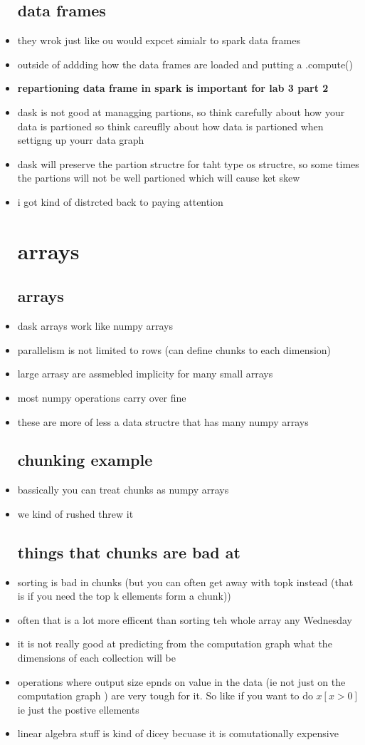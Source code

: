 \documentclass{article}
\begin{document}
\begin{itemize}
\subsection{data frames}
\item they wrok just like ou would expcet simialr to spark data frames 
\item outside of addding how the data frames are loaded and putting a .compute()
\item \textbf{repartioning data frame in spark is important for lab 3 part 2}
\item dask is not good at managging partions, so think carefully about how your data is partioned so think careuflly about how data is partioned when settigng up yourr data graph
\item dask will preserve the partion structre for taht type os structre, so some times the partions will not be well partioned which will cause ket skew
\item i got kind of distrcted back to paying attention 

\section{arrays}
\subsection{arrays}
\item dask arrays work like numpy arrays 
\item parallelism is not limited to rows  (can define chunks to each dimension)
\item large arrasy are assmebled implicity for many small arrays 
\item most numpy operations carry over fine 
\item these are more of less a data structre that has many numpy arrays 
\subsection{chunking example}
\item bassically you can treat chunks as numpy arrays 
\item we kind of rushed threw it 
\subsection{things that chunks are bad at}
\item sorting is bad in chunks (but you can often get away with topk instead (that is if you need the top k ellements form a chunk))
\item often that is a lot more efficent than sorting teh whole array any Wednesday
\item it is not really good at predicting from the computation graph what the dimensions of each collection will be 
\item operations where output size epnds on value in the data (ie not just on the computation graph ) are very tough for it. So like if you want to do $x[x>0]$ ie just the postive ellements
\item linear algebra stuff is kind of dicey becuase it is comutationally expensive

\end{itemize}
\end{document}
